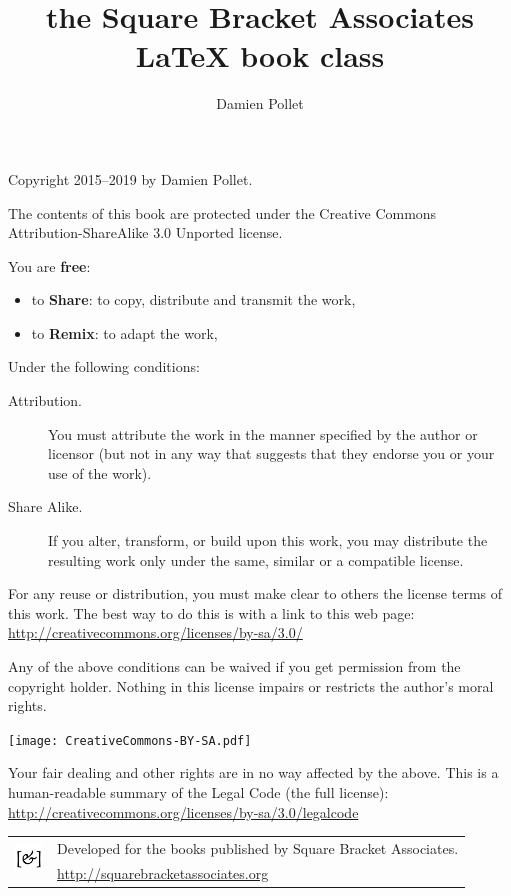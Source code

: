 \documentclass[twoside,openany,showtrims]{sbabook.bod}
\title{the Square Bracket Associates\titlebreak{}
  \texorpdfstring{\protect\LaTeX}{LaTeX} book class}
\author{Damien Pollet}
\date{\gitdate\titlebreak[\smallskip]{ -- }\protect\gitCommitInfo}
\begin{document}
\maketitle
\pagestyle{titlingpage}
\thispagestyle{titlingpage} %

\cleartoverso
{\small

  Copyright 2015--2019 by Damien Pollet.

  The contents of this book are protected under the Creative Commons
  Attribution-ShareAlike 3.0 Unported license.

  You are \textbf{free}:
  \begin{itemize}
  \item to \textbf{Share}: to copy, distribute and transmit the work,
  \item to \textbf{Remix}: to adapt the work,
  \end{itemize}

  Under the following conditions:
  \begin{description}
  \item[Attribution.] You must attribute the work in the manner specified by the
    author or licensor (but not in any way that suggests that they endorse you
    or your use of the work).
  \item[Share Alike.] If you alter, transform, or build upon this work, you may
    distribute the resulting work only under the same, similar or a compatible
    license.
  \end{description}

  For any reuse or distribution, you must make clear to others the
  license terms of this work. The best way to do this is with a link to
  this web page: \\
  \url{http://creativecommons.org/licenses/by-sa/3.0/}

  Any of the above conditions can be waived if you get permission from
  the copyright holder. Nothing in this license impairs or restricts the
  author's moral rights.

  \begin{center}
    \texttt{[image: CreativeCommons-BY-SA.pdf]}
  \end{center}

  Your fair dealing and other rights are in no way affected by the
  above. This is a human-readable summary of the Legal Code (the full
  license): \\
  \url{http://creativecommons.org/licenses/by-sa/3.0/legalcode}

  \vfill

  \begin{tabular}{@{}c@{\quad}l}
    \multirow{2}{*}{\includegraphics[width=2em]{sba-logo.pdf}}
    & Developed for the books published by Square Bracket Associates. \\
    & \url{http://squarebracketassociates.org} \\[\smallskipamount]
  \end{tabular}
}
\end{document}
